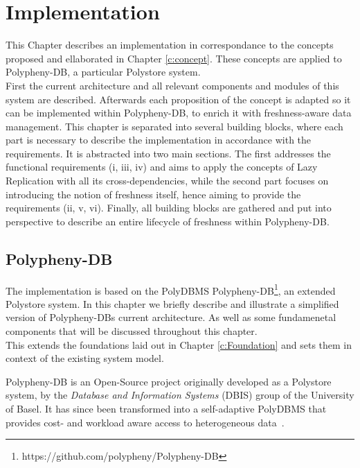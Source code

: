 \chapter{Implementation}
\label{c:implementation}

This Chapter describes an implementation in correspondance to the concepts proposed and ellaborated in Chapter \ref{c:concept}. 
These concepts are applied to Polypheny-DB, a particular Polystore system.\\
First the current architecture and all relevant components and modules of this system are described. Afterwards each proposition of the concept is adapted
so it can be implemented within Polypheny-DB, to enrich it with freshness-aware data management.
This chapter is separated into several building blocks, where each part is necessary to describe the implementation in accordance with the requirements.
It is abstracted into two main sections. The first addresses the functional requirements (i, iii, iv) and aims to apply the concepts of Lazy Replication with all its
cross-dependencies, while the second part focuses on introducing the notion of freshness itself, hence aiming to provide the requirements (ii, v, vi).
Finally, all building blocks are gathered and put into perspective to describe an entire lifecycle of freshness within Polypheny-DB. 





\section{Polypheny-DB}
\label{sec:architecture}


The implementation is based on the PolyDBMS Polypheny-DB\footnote{https://github.com/polypheny/Polypheny-DB}, an extended Polystore system.
In this chapter we briefly describe and illustrate a simplified version of Polypheny-DBs current architecture.
As well as some fundamenetal components that will be discussed throughout this chapter.\\
This extends the foundations laid out in Chapter \ref{c:Foundation} and sets them in context of the existing system model.




Polypheny-DB is an Open-Source project originally developed as a Polystore system, by 
the \textit{Database and Information Systems} (DBIS) group of the University of Basel.
It has since been transformed into a self-adaptive PolyDBMS that provides cost- and workload aware access to heterogeneous data~\cite{poly2020}.

